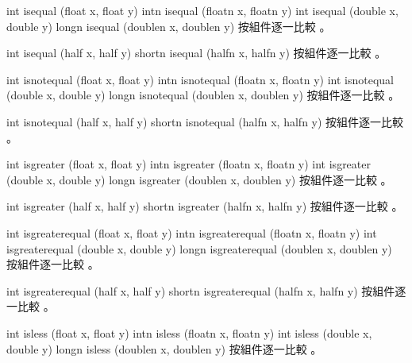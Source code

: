 int isequal (float x, float y)
intn isequal (floatn x, floatn y)
int isequal (double x, double y)
longn isequal (doublen x, doublen y)
\stopbuffer
{}
按組件逐一比較 。
\stopbuffer

int isequal (half x, half y)
shortn isequal (halfn x, halfn y)
\stopbuffer
{}
按組件逐一比較 。
\stopbuffer

int isnotequal (float x, float y)
intn isnotequal (floatn x, floatn y)
int isnotequal (double x, double y)
longn isnotequal (doublen x, doublen y)
\stopbuffer
{}
按組件逐一比較 。
\stopbuffer

int isnotequal (half x, half y)
shortn isnotequal (halfn x, halfn y)
\stopbuffer
{}
按組件逐一比較 。
\stopbuffer

int isgreater (float x, float y)
intn isgreater (floatn x, floatn y)
int isgreater (double x, double y)
longn isgreater (doublen x, doublen y)
\stopbuffer
{}
按組件逐一比較 。
\stopbuffer

int isgreater (half x, half y)
shortn isgreater (halfn x, halfn y)
\stopbuffer
{}
按組件逐一比較 。
\stopbuffer

int isgreaterequal (float x, float y)
intn isgreaterequal (floatn x, floatn y)
int isgreaterequal (double x,
		double y)
longn isgreaterequal (doublen x,
		doublen y)
\stopbuffer
{}
按組件逐一比較 。
\stopbuffer

int isgreaterequal (half x, half y)
shortn isgreaterequal (halfn x, halfn y)
\stopbuffer
{}
按組件逐一比較 。
\stopbuffer

int isless (float x, float y)
intn isless (floatn x, floatn y)
int isless (double x, double y)
longn isless (doublen x, doublen y)
\stopbuffer
{}
按組件逐一比較 。
\stopbuffer

